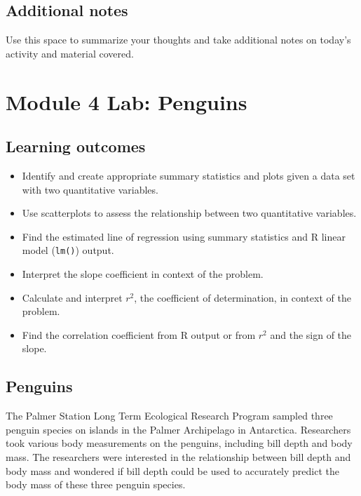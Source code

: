 \documentclass[
]{report}
\begin{document}
\hypertarget{additional-notes-7}{%
\subsection{Additional notes}\label{additional-notes-7}}

Use this space to summarize your thoughts and take additional notes on today's activity and material covered.

\newpage

\hypertarget{module-4-lab-penguins}{%
\section{Module 4 Lab: Penguins}\label{module-4-lab-penguins}}


\hypertarget{learning-outcomes-9}{%
\subsection{Learning outcomes}\label{learning-outcomes-9}}

\begin{itemize}
\item
  Identify and create appropriate summary statistics and plots
  given a data set with two quantitative variables.
\item
  Use scatterplots to assess the relationship between two quantitative variables.
\item
  Find the estimated line of regression using summary statistics and R linear model (\texttt{lm()}) output.
\item
  Interpret the slope coefficient in context of the problem.
\item
  Calculate and interpret \(r^2\), the coefficient of determination, in context of the problem.
\item
  Find the correlation coefficient from R output or from \(r^2\) and the sign of the slope.
\end{itemize}

\hypertarget{penguins}{%
\subsection*{Penguins}\label{penguins}}

The Palmer Station Long Term Ecological Research Program sampled three penguin species on islands in the Palmer Archipelago in Antarctica. Researchers took various body measurements on the penguins, including bill depth and body mass. The researchers were interested in the relationship between bill depth and body mass and wondered if bill depth could be used to accurately predict the body mass of these three penguin species.
\end{document}
